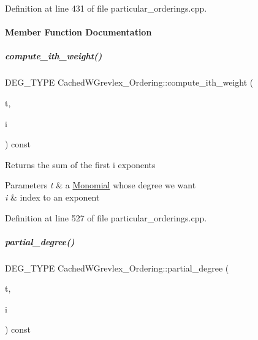 Definition at line 431 of file particular\+\_\+orderings.\+cpp.



\paragraph{Member Function Documentation}
\mbox{\label{group__orderinggroup_a960a5b3460c4cab0dfd89bc0663c6ee0}} 
\subparagraph{\texorpdfstring{compute\+\_\+ith\+\_\+weight()}{compute\_ith\_weight()}}
{\footnotesize\ttfamily D\+E\+G\+\_\+\+T\+Y\+PE Cached\+W\+Grevlex\+\_\+\+Ordering\+::compute\+\_\+ith\+\_\+weight (\begin{DoxyParamCaption}\item[{const \hyperlink{group__polygroup_class_monomial}{Monomial} \&}]{t,  }\item[{N\+V\+A\+R\+\_\+\+T\+Y\+PE}]{i }\end{DoxyParamCaption}) const}

\begin{DoxyReturn}{Returns}
the sum of the first i exponents 
\end{DoxyReturn}

\begin{DoxyParams}{Parameters}
{\em t} & a \hyperlink{group__polygroup_class_monomial}{Monomial} whose degree we want \\
\hline
{\em i} & index to an exponent \\
\hline
\end{DoxyParams}


Definition at line 527 of file particular\+\_\+orderings.\+cpp.

\mbox{\label{group__orderinggroup_af04f39af33cba2c1c4f985e57ea8d136}} 
\subparagraph{\texorpdfstring{partial\+\_\+degree()}{partial\_degree()}}
{\footnotesize\ttfamily D\+E\+G\+\_\+\+T\+Y\+PE Cached\+W\+Grevlex\+\_\+\+Ordering\+::partial\+\_\+degree (\begin{DoxyParamCaption}\item[{const \hyperlink{group__polygroup_class_monomial}{Monomial} \&}]{t,  }\item[{N\+V\+A\+R\+\_\+\+T\+Y\+PE}]{i }\end{DoxyParamCaption}) const\hspace{0.3cm}{\ttfamily [inline]}}

